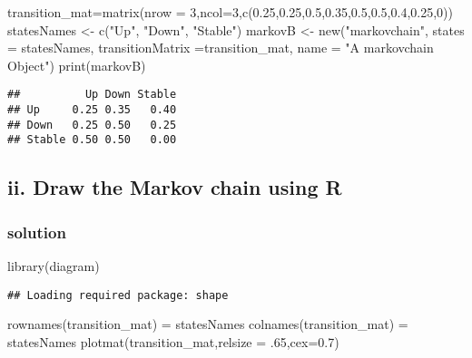 \documentclass[
]{article}
\newenvironment{Shaded}{\begin{snugshade}}{\end{snugshade}}
\newcommand{\AttributeTok}[1]{\textcolor[rgb]{0.77,0.63,0.00}{#1}}
\newcommand{\DecValTok}[1]{\textcolor[rgb]{0.00,0.00,0.81}{#1}}
\newcommand{\FloatTok}[1]{\textcolor[rgb]{0.00,0.00,0.81}{#1}}
\newcommand{\FunctionTok}[1]{\textcolor[rgb]{0.00,0.00,0.00}{#1}}
\newcommand{\NormalTok}[1]{#1}
\newcommand{\OtherTok}[1]{\textcolor[rgb]{0.56,0.35,0.01}{#1}}
\newcommand{\StringTok}[1]{\textcolor[rgb]{0.31,0.60,0.02}{#1}}
\begin{document}
\begin{Shaded}
\begin{Highlighting}[]
\NormalTok{transition\_mat}\OtherTok{=}\FunctionTok{matrix}\NormalTok{(}\AttributeTok{nrow =} \DecValTok{3}\NormalTok{,}\AttributeTok{ncol=}\DecValTok{3}\NormalTok{,}\FunctionTok{c}\NormalTok{(}\FloatTok{0.25}\NormalTok{,}\FloatTok{0.25}\NormalTok{,}\FloatTok{0.5}\NormalTok{,}\FloatTok{0.35}\NormalTok{,}\FloatTok{0.5}\NormalTok{,}\FloatTok{0.5}\NormalTok{,}\FloatTok{0.4}\NormalTok{,}\FloatTok{0.25}\NormalTok{,}\DecValTok{0}\NormalTok{))}
\NormalTok{statesNames }\OtherTok{\textless{}{-}} \FunctionTok{c}\NormalTok{(}\StringTok{"Up"}\NormalTok{, }\StringTok{"Down"}\NormalTok{, }\StringTok{"Stable"}\NormalTok{)}
\NormalTok{markovB }\OtherTok{\textless{}{-}} \FunctionTok{new}\NormalTok{(}\StringTok{"markovchain"}\NormalTok{, }\AttributeTok{states =}\NormalTok{ statesNames, }\AttributeTok{transitionMatrix =}\NormalTok{transition\_mat, }\AttributeTok{name =} \StringTok{"A markovchain Object"}\NormalTok{)}
\FunctionTok{print}\NormalTok{(markovB)}
\end{Highlighting}
\end{Shaded}

\begin{verbatim}
##          Up Down Stable
## Up     0.25 0.35   0.40
## Down   0.25 0.50   0.25
## Stable 0.50 0.50   0.00
\end{verbatim}

\hypertarget{ii.-draw-the-markov-chain-using-r}{%
\subsection{ii. Draw the Markov chain using
R}\label{ii.-draw-the-markov-chain-using-r}}

\hypertarget{solution-2}{%
\subsubsection{solution}\label{solution-2}}

\begin{Shaded}
\begin{Highlighting}[]
\FunctionTok{library}\NormalTok{(diagram)}
\end{Highlighting}
\end{Shaded}

\begin{verbatim}
## Loading required package: shape
\end{verbatim}

\begin{Shaded}
\begin{Highlighting}[]
\FunctionTok{rownames}\NormalTok{(transition\_mat) }\OtherTok{=}\NormalTok{ statesNames}
\FunctionTok{colnames}\NormalTok{(transition\_mat) }\OtherTok{=}\NormalTok{ statesNames}
\FunctionTok{plotmat}\NormalTok{(transition\_mat,}\AttributeTok{relsize =}\NormalTok{ .}\DecValTok{65}\NormalTok{,}\AttributeTok{cex=}\FloatTok{0.7}\NormalTok{)}
\end{Highlighting}
\end{Shaded}
\end{document}
